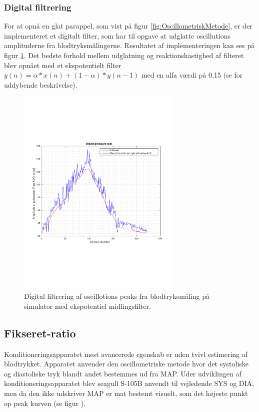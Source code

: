 \subsubsection{Digital filtrering}
For at opnå en glat parappel, som vist på  figur \ref{fig:OscillometriskMetode}, er der implementeret et digitalt filter, som har til opgave at udglatte oscillutions amplituderne fra blodtryksmålingerne. Resultatet af implementeringen kan ses på figur \ref{fig:digitalFilterData}. Det bedste forhold mellem udglatning og reaktionshastighed af filteret blev opnået med et ekspotentielt filter $y(n)=\alpha*x(n)+(1-\alpha)*y(n-1)$ med en alfa værdi på 0.15 (se  for uddybende beskrivelse).  

\begin{figure}[H]
	\centering
	\includegraphics[trim={0 0 0 0},clip, width=0.7\textwidth]{billeder/digitalFilterData.pdf}	
	\parbox{10.5cm}{\caption{Digital filtrering af oscillotions peaks fra blodtryksmåling på simulator med ekspotentiel midlingsfilter.}\label{fig:digitalFilterData}}
\end{figure}


\subsection{Fikseret-ratio} \label{Fikseret-ratio}
Konditioneringsapparatet mest avancerede egenskab er uden tvivl estimering af blodtrykket. Apparatet anvender den oscillometriske metode hvor det systoliske og diastoliske tryk blandt andet bestemmes ud fra MAP. Uder udviklingen af konditioneringsapparatet blev seagull S-105B anvendt til vejledende SYS og DIA, men da den ikke udskriver MAP er mat bestemt visuelt, som det højeste punkt op peak kurven (se figur ).

